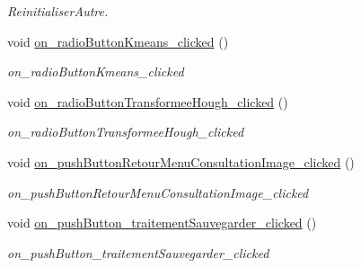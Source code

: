 \begin{DoxyCompactItemize}
\begin{DoxyCompactList}\small\item\em Reinitialiser\+Autre. \end{DoxyCompactList}\item 
\mbox{\label{classAppMainWindow_a9323c81eaff11e78f5787204f319d10e}} 
void \hyperlink{classAppMainWindow_a9323c81eaff11e78f5787204f319d10e}{on\+\_\+radio\+Button\+Kmeans\+\_\+clicked} ()
\begin{DoxyCompactList}\small\item\em on\+\_\+radio\+Button\+Kmeans\+\_\+clicked \end{DoxyCompactList}\item 
\mbox{\label{classAppMainWindow_abfab63029059045a7ed05528e20c732c}} 
void \hyperlink{classAppMainWindow_abfab63029059045a7ed05528e20c732c}{on\+\_\+radio\+Button\+Transformee\+Hough\+\_\+clicked} ()
\begin{DoxyCompactList}\small\item\em on\+\_\+radio\+Button\+Transformee\+Hough\+\_\+clicked \end{DoxyCompactList}\item 
\mbox{\label{classAppMainWindow_a7d83f035911eed67d28eada106d4e6a9}} 
void \hyperlink{classAppMainWindow_a7d83f035911eed67d28eada106d4e6a9}{on\+\_\+push\+Button\+Retour\+Menu\+Consultation\+Image\+\_\+clicked} ()
\begin{DoxyCompactList}\small\item\em on\+\_\+push\+Button\+Retour\+Menu\+Consultation\+Image\+\_\+clicked \end{DoxyCompactList}\item 
\mbox{\label{classAppMainWindow_a30b6db7fceed761eda6e6b9589dad8ff}} 
void \hyperlink{classAppMainWindow_a30b6db7fceed761eda6e6b9589dad8ff}{on\+\_\+push\+Button\+\_\+traitement\+Sauvegarder\+\_\+clicked} ()
\begin{DoxyCompactList}\small\item\em on\+\_\+push\+Button\+\_\+traitement\+Sauvegarder\+\_\+clicked \end{DoxyCompactList}\end{DoxyCompactItemize}
